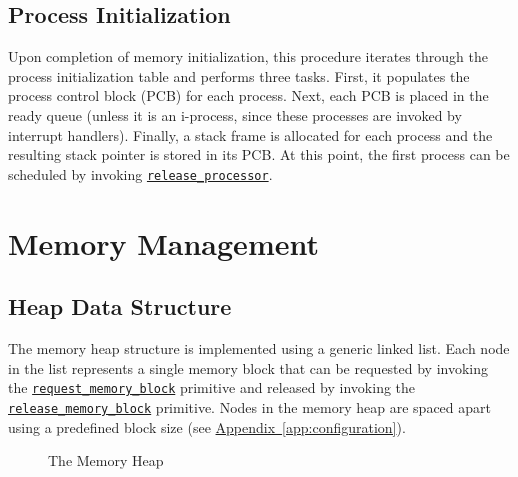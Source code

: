 \documentclass[12pt]{report}
\begin{document}
\subsection{Process Initialization}

Upon completion of memory initialization, this procedure iterates through the process initialization table and performs three tasks. First, it populates the process control block (PCB) for each process. Next, each PCB is placed in the ready queue (unless it is an i-process, since these processes are invoked by interrupt handlers). Finally, a stack frame is allocated for each process and the resulting stack pointer is stored in its PCB. At this point, the first process can be scheduled by invoking \hyperref[alg:releasingtheprocessor]{\texttt{release_processor}}.

\section{Memory Management}

\subsection{Heap Data Structure}

The memory heap structure is implemented using a generic linked list. Each node in the list represents a single memory block that can be requested by invoking the \hyperref[alg:requestingmemoryblocks]{\texttt{request_memory_block}} primitive and released by invoking the \hyperref[alg:releasingmemoryblocks]{\texttt{release_memory_block}} primitive. Nodes in the memory heap are spaced apart using a predefined block size (see \hyperref[app:configuration]{Appendix~\ref*{app:configuration}}).

\begin{figure}[H]

\centering

\caption{The Memory Heap}

\vspace{1em}


\end{figure}
\end{document}
